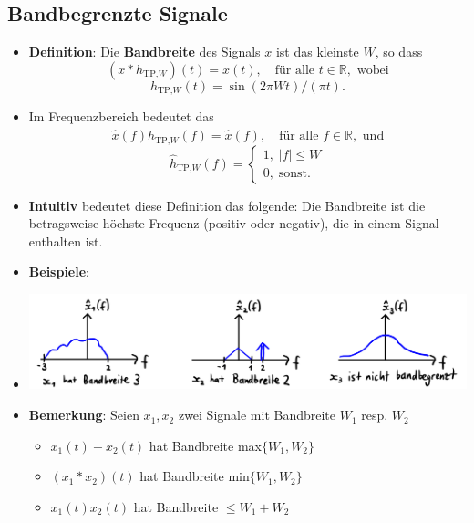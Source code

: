 \documentclass[11pt]{article}
\begin{document}
\subsection*{Bandbegrenzte Signale}
\vspace*{-0.5cm}
\begin{itemize}[leftmargin=0pt]
    \item[] \textbf{Definition}: Die \textbf{Bandbreite} des Signals $x$ ist das kleinste $W$, so dass
    $$(x \ast h_{\text{TP,}W})(t) = x(t), \hspace{12pt} \text{für alle } t \in \mathbb{R}, \text{ wobei}$$
    $$h_{\text{TP,}W}(t) = \sin (2 \pi W t)/(\pi t).$$
    \item[] Im Frequenzbereich bedeutet das
    $$\hat{x}(f)\hat{h}_{\text{TP,}W}(f) = \hat{x}(f), \hspace{12pt} \text{für alle }f\in \mathbb{R}, \text{ und}$$
    $$\hat{h}_{\text{TP,}W}(f) = \begin{cases}
        1, \; |f| \leq W \\
        0, \; \text{sonst.}
    \end{cases}$$
    \item[] \textbf{Intuitiv} bedeutet diese Definition das folgende: Die Bandbreite ist die betragsweise höchste Frequenz (positiv oder negativ), die in einem Signal enthalten ist.
    \item[] \textbf{Beispiele}:
    \item[] \begin{center}
        \includegraphics[width=0.9\linewidth]{docimgs/Bandbreite.jpg}
    \end{center}
    \item[] \textbf{Bemerkung}: Seien $x_1, x_2$ zwei Signale mit Bandbreite $W_1$ resp. $W_2$ \begin{itemize}
        \item $x_1(t) + x_2(t)$ hat Bandbreite max$\{W_1, W_2\}$
        \item $(x_1 \ast x_2)(t)$ hat Bandbreite min$\{W_1, W_2\}$
        \item $x_1(t)x_2(t)$ hat Bandbreite $\leq W_1 + W_2$
    \end{itemize}
\end{itemize}
\end{document}
